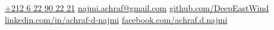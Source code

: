 \documentclass[darkhipster]{hipstercv}
\newlength{\rightcolwidth}
\begin{document}
\begin{paracol}{2}
\setlength{\parindent}{0pt}
\begin{minipage}[t]{\rightcolwidth}
\begin{center}\fontfamily{\sfdefault}\selectfont \color{black!70}
{\href{callto:+212622902221}{ +212 6 22 90 22 21} \href{mailto:najmi.achraf@gmail.com}{ najmi.achraf@gmail.com} \href{https://www.github.com/DeepEastWind}{ github.com/DeepEastWind} \newline\href{https://www.linkedin.com/in/achraf-d-najmi}{ linkedin.com/in/achraf-d-najmi} \href{https://www.facebook.com/achraf.d.najmi}{ facebook.com/achraf.d.najmi}
}
\end{center}\vspace{-4em}
\end{minipage}


\end{paracol}
\end{document}
